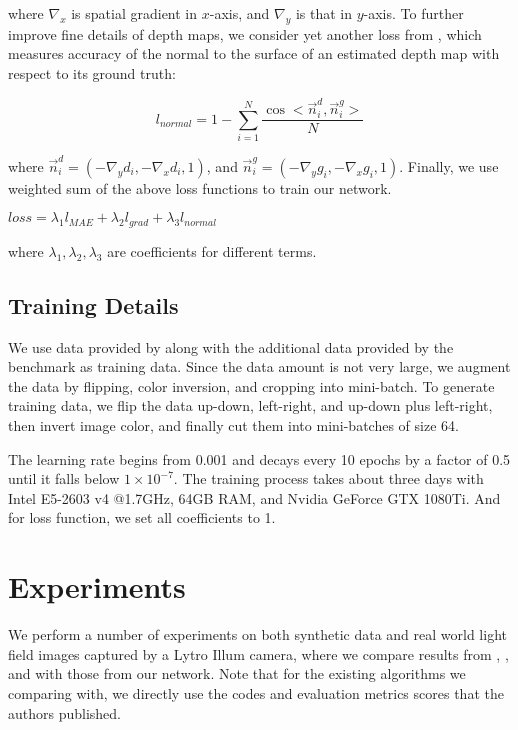 \documentclass[10pt,twocolumn,letterpaper]{article}
\begin{document}
where $\nabla_{x}$ is spatial gradient in $x$-axis, and  $\nabla_{y}$ is that in $y$-axis. To further improve fine details of depth maps, we consider yet another loss from \cite{hu2018revisiting}, which measures accuracy of the normal to the surface of an estimated depth map with respect to its ground truth:

$$l_{normal} = 1 - \sum_{i=1}^{N} \frac{\cos <\overrightarrow{n}^{d}_{i}, \overrightarrow{n}^{g}_{i}>}{N}$$

where $\overrightarrow{n}^{d}_{i} = (-\nabla_{y}d_{i}, -\nabla_{x}d_{i}, 1)$, and $\overrightarrow{n}^{g}_{i} = (-\nabla_{y}g_{i}, -\nabla_{x}g_{i}, 1)$. Finally, we use weighted sum of the above loss functions to train our network.

$loss = \lambda_{1}l_{MAE}+\lambda_{2}l_{grad}+\lambda_{3}l_{normal} $

where $\lambda_{1}, \lambda_{2}, \lambda_{3}$ are coefficients for different terms.
      

\subsection{Training Details}

We use data provided by \cite{alperovich2018light} along with the additional data provided by the benchmark \cite{honauer2016dataset} as training data. Since the data amount is not very large, we augment the data by flipping, color inversion, and cropping into mini-batch. To generate training data, we flip the data up-down, left-right, and up-down plus left-right, then invert image color, and finally cut them into mini-batches of size 64.

The learning rate begins from 0.001 and decays every 10 epochs by a factor of 0.5 until it falls below $1\times10^{-7}$. The training process takes about three days with Intel E5-2603 v4 @1.7GHz, 64GB RAM, and Nvidia GeForce GTX 1080Ti. And for loss function, we set all coefficients to 1.

\section{Experiments}

We perform a number of experiments on both synthetic data and real world light field images captured by a Lytro Illum camera, where we compare results from \cite{jeon2015accurate}, \cite{zhang2016robust}, and \cite{shin2018epinet} with those from our network. Note that for the existing algorithms we comparing with, we directly use the codes and evaluation metrics scores that the authors published.
\end{document}
